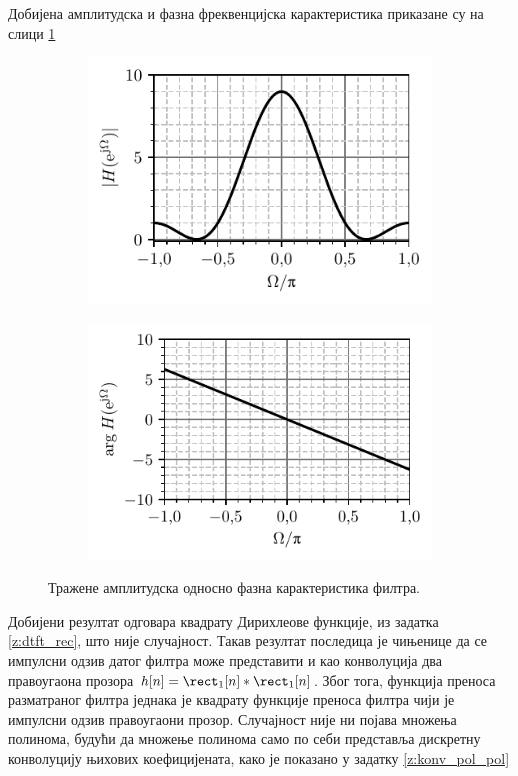Добијена амплитудска и фазна фреквенцијска карактеристика приказане су на слици \ref{fig:\ID.hz}
\begin{figure}
    \centering
    \begin{subfigure}{0.49\textwidth}
        \centering
        \includegraphics{fig/zt_tri.pdf}
    \end{subfigure}
    \begin{subfigure}{0.49\textwidth}
        \centering
        \includegraphics{fig/zt_tri_faz.pdf}
    \end{subfigure}
    \caption{Тражене амплитудска односно фазна карактеристика филтра.}
    \label{fig:\ID.hz}
\end{figure}

Добијени резултат одговара квадрату Дирихлеове функције, из задатка \ref{z:dtft_rec}, што није случајност. 
Такав резултат последица је чињенице да се импулсни одзив датог филтра може представити и као 
конволуција два правоугаона прозора $h[n] = \rect_1[n] \ast \rect_1[n]$. Због тога, функција преноса 
разматраног филтра једнака је квадрату функције преноса 
филтра чији је импулсни одзив правоугаони прозор. Случајност није ни појава множења полинома, будући да множење полинома само по 
себи представља дискретну конволуцију њихових коефицијената, како је показано у задатку \ref{z:konv_pol_pol}
